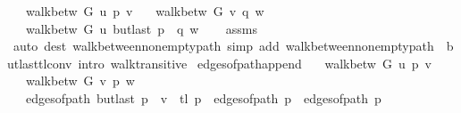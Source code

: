\begin{isabellebody}
\ \ \ {\isachardoublequoteopen}walk{\isacharunderscore}{\kern0pt}betw\ G\ u\ p\ v{\isachardoublequoteclose}\isanewline
\ \ \ {\isachardoublequoteopen}walk{\isacharunderscore}{\kern0pt}betw\ G\ v\ q\ w{\isachardoublequoteclose}\isanewline
\ \ \ {\isachardoublequoteopen}walk{\isacharunderscore}{\kern0pt}betw\ G\ u\ {\isacharparenleft}{\kern0pt}butlast\ p\ {\isacharat}{\kern0pt}\ q{\isacharparenright}{\kern0pt}\ w{\isachardoublequoteclose}%
\endisataginvisible
{\isafoldinvisible}%
%
\isadeliminvisible
\isanewline
%
\endisadeliminvisible
%
\isadelimproof
\ \ %
\endisadelimproof
%
\isatagproof
{}\isamarkupfalse%
\ assms\isanewline
\ \ \isamarkupfalse%
\ {\isacharparenleft}{\kern0pt}auto\ dest{\isacharcolon}{\kern0pt}\ walk{\isacharunderscore}{\kern0pt}between{\isacharunderscore}{\kern0pt}nonempty{\isacharunderscore}{\kern0pt}path{\isacharparenleft}{\kern0pt}{}{\isacharparenright}{\kern0pt}\ simp\ add{\isacharcolon}{\kern0pt}\ walk{\isacharunderscore}{\kern0pt}between{\isacharunderscore}{\kern0pt}nonempty{\isacharunderscore}{\kern0pt}path{\isacharparenleft}{\kern0pt}{}{\isacharcomma}{\kern0pt}\ {}{\isacharparenright}{\kern0pt}\ butlast{\isacharunderscore}{\kern0pt}tl{\isacharunderscore}{\kern0pt}conv\ intro{\isacharcolon}{\kern0pt}\ walk{\isacharunderscore}{\kern0pt}transitive{\isacharparenright}{\kern0pt}%
\endisatagproof
{\isafoldproof}%
%
\isadelimproof
\isanewline
%
\endisadelimproof
\isanewline
{}\isamarkupfalse%
\ edges{\isacharunderscore}{\kern0pt}of{\isacharunderscore}{\kern0pt}path{\isacharunderscore}{\kern0pt}append{\isacharcolon}{\kern0pt}\isanewline
\ \ \ {\isachardoublequoteopen}walk{\isacharunderscore}{\kern0pt}betw\ G\ u\ p\ v{\isachardoublequoteclose}\isanewline
\ \ \ {\isachardoublequoteopen}walk{\isacharunderscore}{\kern0pt}betw\ G\ v\ p{\isacharprime}{\kern0pt}\ w{\isachardoublequoteclose}\isanewline
\ \ \ {\isachardoublequoteopen}edges{\isacharunderscore}{\kern0pt}of{\isacharunderscore}{\kern0pt}path\ {\isacharparenleft}{\kern0pt}{\isacharparenleft}{\kern0pt}butlast\ p\ {\isacharat}{\kern0pt}\ {\isacharbrackleft}{\kern0pt}v{\isacharbrackright}{\kern0pt}{\isacharparenright}{\kern0pt}\ {\isacharat}{\kern0pt}\ tl\ p{\isacharprime}{\kern0pt}{\isacharparenright}{\kern0pt}\ {\isacharequal}{\kern0pt}\ edges{\isacharunderscore}{\kern0pt}of{\isacharunderscore}{\kern0pt}path\ p\ {\isacharat}{\kern0pt}\ edges{\isacharunderscore}{\kern0pt}of{\isacharunderscore}{\kern0pt}path\ p{\isacharprime}{\kern0pt}{\isachardoublequoteclose}\isanewline

\end{isabellebody}
